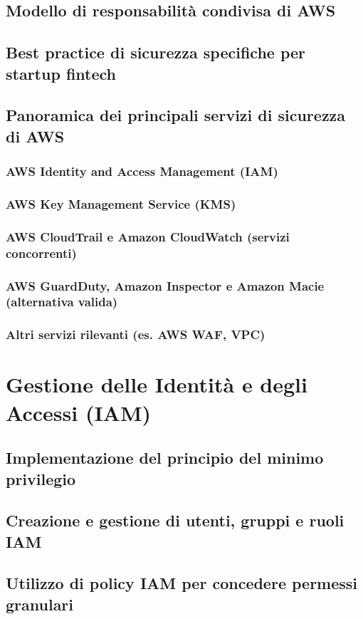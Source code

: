 \documentclass[a4paper,12pt]{report}
\begin{document}
\section{Modello di responsabilità condivisa di AWS}
\section{Best practice di sicurezza specifiche per startup fintech}
\section{Panoramica dei principali servizi di sicurezza di AWS}
\subsection{AWS Identity and Access Management (IAM)}
\subsection{AWS Key Management Service (KMS)}
\subsection{AWS CloudTrail e Amazon CloudWatch (servizi concorrenti)}
\subsection{AWS GuardDuty, Amazon Inspector e Amazon Macie (alternativa valida)}
\subsection{Altri servizi rilevanti (es. AWS WAF, VPC)}

\chapter{Gestione delle Identità e degli Accessi (IAM)}
\section{Implementazione del principio del minimo privilegio}
\section{Creazione e gestione di utenti, gruppi e ruoli IAM}
\section{Utilizzo di policy IAM per concedere permessi granulari}
\end{document}
